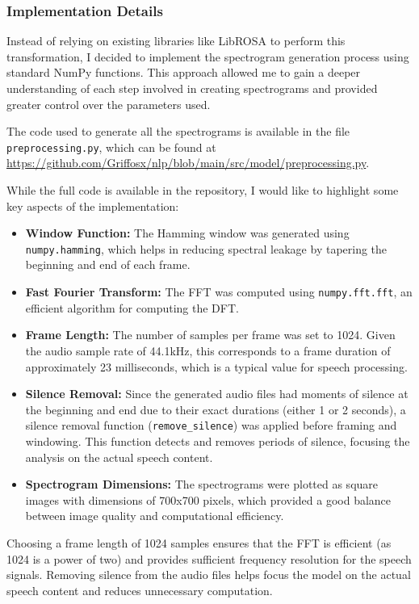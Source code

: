 \documentclass[12pt]{article}
\begin{document}
\subsubsection{Implementation Details}

Instead of relying on existing libraries like LibROSA to perform this transformation, I decided to implement the spectrogram generation process using standard NumPy functions. This approach allowed me to gain a deeper understanding of each step involved in creating spectrograms and provided greater control over the parameters used.

The code used to generate all the spectrograms is available in the file \texttt{preprocessing.py}, which can be found at \href{https://github.com/Griffosx/nlp/blob/main/src/model/preprocessing.py}{https://github.com/Griffosx/nlp/blob/main/src/model/preprocessing.py}.

While the full code is available in the repository, I would like to highlight some key aspects of the implementation:

\begin{itemize}
\item \textbf{Window Function:} The Hamming window was generated using \texttt{numpy.hamming}, which helps in reducing spectral leakage by tapering the beginning and end of each frame.
\item \textbf{Fast Fourier Transform:} The FFT was computed using \texttt{numpy.fft.fft}, an efficient algorithm for computing the DFT.
\item \textbf{Frame Length:} The number of samples per frame was set to 1024. Given the audio sample rate of 44.1kHz, this corresponds to a frame duration of approximately 23 milliseconds, which is a typical value for speech processing.
\item \textbf{Silence Removal:} Since the generated audio files had moments of silence at the beginning and end due to their exact durations (either 1 or 2 seconds), a silence removal function (\verb|remove_silence|) was applied before framing and windowing. This function detects and removes periods of silence, focusing the analysis on the actual speech content.
\item \textbf{Spectrogram Dimensions:} The spectrograms were plotted as square images with dimensions of 700x700 pixels, which provided a good balance between image quality and computational efficiency.
\end{itemize}

Choosing a frame length of 1024 samples ensures that the FFT is efficient (as 1024 is a power of two) and provides sufficient frequency resolution for the speech signals. Removing silence from the audio files helps focus the model on the actual speech content and reduces unnecessary computation.
\end{document}
